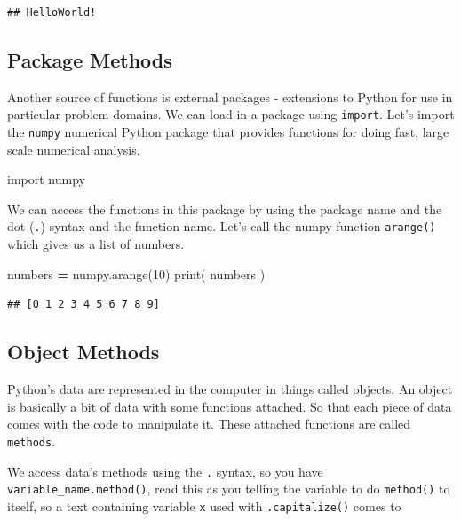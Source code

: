 \documentclass[]{book}
\newenvironment{Shaded}{\begin{snugshade}}{\end{snugshade}}
\newcommand{\BuiltInTok}[1]{#1}
\newcommand{\DecValTok}[1]{\textcolor[rgb]{0.00,0.00,0.81}{#1}}
\newcommand{\ImportTok}[1]{#1}
\newcommand{\NormalTok}[1]{#1}
\newcommand{\OperatorTok}[1]{\textcolor[rgb]{0.81,0.36,0.00}{\textbf{#1}}}
\theoremstyle{definition}
\theoremstyle{definition}
\theoremstyle{definition}
\theoremstyle{remark}
\begin{document}
\begin{verbatim}
## HelloWorld!
\end{verbatim}

\hypertarget{package-methods}{%
\subsection{Package Methods}\label{package-methods}}

Another source of functions is external packages - extensions to Python
for use in particular problem domains. We can load in a package using
\texttt{import}. Let's import the \texttt{numpy} numerical Python
package that provides functions for doing fast, large scale numerical
analysis.

\begin{Shaded}
\begin{Highlighting}[]
\ImportTok{import}\NormalTok{ numpy}
\end{Highlighting}
\end{Shaded}

We can access the functions in this package by using the package name
and the dot (\texttt{.}) syntax and the function name. Let's call the
numpy function \texttt{arange()} which gives us a list of numbers.

\begin{Shaded}
\begin{Highlighting}[]
\NormalTok{numbers }\OperatorTok{=}\NormalTok{ numpy.arange(}\DecValTok{10}\NormalTok{)}
\BuiltInTok{print}\NormalTok{( numbers )}
\end{Highlighting}
\end{Shaded}

\begin{verbatim}
## [0 1 2 3 4 5 6 7 8 9]
\end{verbatim}

\hypertarget{object-methods}{%
\subsection{Object Methods}\label{object-methods}}

Python's data are represented in the computer in things called objects.
An object is basically a bit of data with some functions attached. So
that each piece of data comes with the code to manipulate it. These
attached functions are called \texttt{methods}.

We access data's methods using the \texttt{.} syntax, so you have
\texttt{variable\_name.method()}, read this as you telling the variable
to do \texttt{method()} to itself, so a text containing variable
\texttt{x} used with \texttt{.capitalize()} comes to
\end{document}
